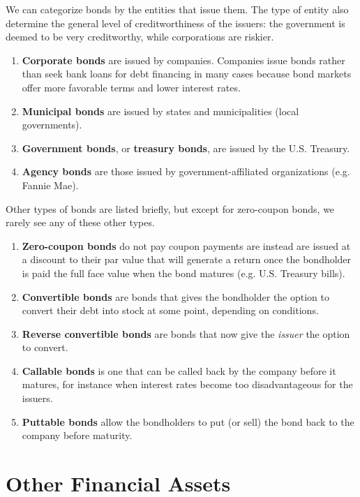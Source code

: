 \documentclass{article}
\begin{document}
    We can categorize bonds by the entities that issue them. The type of entity also determine the general level of creditworthiness of the issuers: the government is deemed to be very creditworthy, while corporations are riskier.
    \begin{enumerate}
      \item \textbf{Corporate bonds} are issued by companies. Companies issue bonds rather than seek bank loans for debt financing in many cases because bond markets offer more favorable terms and lower interest rates.
      \item \textbf{Municipal bonds} are issued by states and municipalities (local governments).
      \item \textbf{Government bonds}, or \textbf{treasury bonds}, are issued by the U.S. Treasury.
      \item \textbf{Agency bonds} are those issued by government-affiliated organizations (e.g. Fannie Mae).
    \end{enumerate}

    Other types of bonds are listed briefly, but except for zero-coupon bonds, we rarely see any of these other types.

    \begin{enumerate}
      \item \textbf{Zero-coupon bonds} do not pay coupon payments are instead are issued at a discount to their par value that will generate a return once the bondholder is paid the full face value when the bond matures (e.g. U.S. Treasury bills).
      \item \textbf{Convertible bonds} are bonds that gives the bondholder the option to convert their debt into stock at some point, depending on conditions.
      \item \textbf{Reverse convertible bonds} are bonds that now give the \textit{issuer} the option to convert.
      \item \textbf{Callable bonds} is one that can be called back by the company before it matures, for instance when interest rates become too disadvantageous for the issuers.
      \item \textbf{Puttable bonds} allow the bondholders to put (or sell) the bond back to the company before maturity.
    \end{enumerate}

\section{Other Financial Assets}
\end{document}
